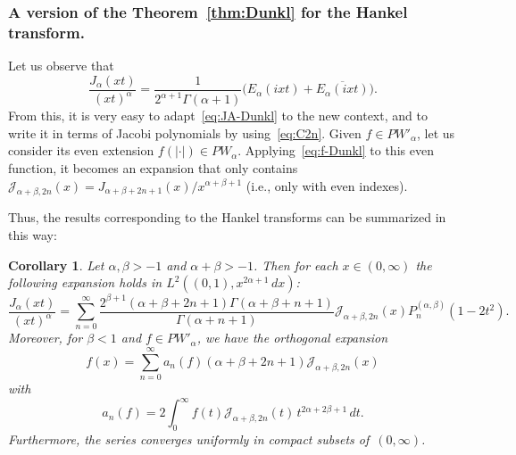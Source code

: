 \documentclass[11pt,a4paper]{amsart}
\theoremstyle{plain}
\newtheorem{Cor}[Thm]{Corollary}
\theoremstyle{definition}
\newcommand{\calJ}{\mathcal{J}}
\begin{document}
\subsubsection{A version of the Theorem~\ref{thm:Dunkl} for the Hankel transform.}

Let us observe that
\begin{equation*}
  \frac{J_{\alpha}(xt)}{(xt)^{\alpha}}
  = \frac{1}{2^{\alpha+1}\Gamma(\alpha+1)}
  \bigl( E_\alpha(ixt) + \overline{E_\alpha(ixt)} \bigr).
\end{equation*}
From this, it is very easy to adapt~\eqref{eq:JA-Dunkl} to the new
context, and to write it in terms of Jacobi polynomials by
using~\eqref{eq:C2n}. Given $f \in PW'_\alpha$, let us consider its
even extension $f(|\cdot|) \in PW_\alpha$.
Applying~\eqref{eq:f-Dunkl} to this even function, it becomes an
expansion that only contains $\calJ_{\alpha+\beta,2n}(x) =
J_{\alpha+\beta+2n+1}(x)/x^{\alpha+\beta+1}$ (i.e., only with even
indexes).

Thus, the results corresponding to the Hankel transforms can be summarized in this way:

\begin{Cor}
Let $\alpha,\beta > -1$ and $\alpha+\beta>-1$. Then for each $x\in (0,\infty)$ 
the following expansion holds in
$L^{2}((0,1),x^{2\alpha+1}\,dx)$:
\begin{equation}
\label{eq:Jxta}
  \frac{J_{\alpha}(xt)}{(xt)^\alpha}
  = \sum_{n = 0}^{\infty}
  \frac{2^{\beta+1}(\alpha+\beta+2n+1) \Gamma(\alpha+\beta+n+1)} {\Gamma(\alpha+n+1)}
  \calJ_{\alpha+\beta,2n}(x) P_{n}^{(\alpha,\beta)}(1-2t^{2}).
\end{equation}
Moreover, for $\beta < 1$ and $f \in PW'_\alpha$, we have the orthogonal expansion
\begin{equation*}
  f(x) = \sum_{n=0}^\infty a_n(f) (\alpha+\beta+2n+1)
  \calJ_{\alpha+\beta,2n}(x)
\end{equation*}
with
\begin{equation*}
  a_n(f) = 2 \int_{0}^{\infty} f(t) \calJ_{\alpha+\beta,2n}(t)
  \,t^{2\alpha+2\beta+1}\,dt.
\end{equation*}
Furthermore, the series converges uniformly in compact subsets of~$(0,\infty)$.
\end{Cor}
\end{document}
